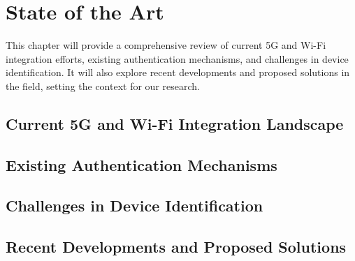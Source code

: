 \chapter{State of the Art}%
\label{chapter:State of the Art}

\begin{introduction}
This chapter will provide a comprehensive review of current \ac{5G} and Wi-Fi integration efforts, existing authentication mechanisms, and challenges in device identification. It will also explore recent developments and proposed solutions in the field, setting the context for our research.
\end{introduction}

\section{Current \ac{5G} and Wi-Fi Integration Landscape}

\section{Existing Authentication Mechanisms}

\section{Challenges in Device Identification}

\section{Recent Developments and Proposed Solutions}